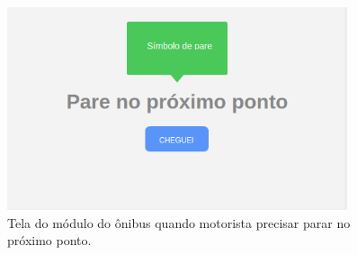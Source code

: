 \documentclass[
	12pt,				%
	oneside,			%
	a4paper,			%
	brazil				%
]{abntex2}
\begin{document}
\begin{figure}[!h]
\centering
\includegraphics[width=10cm, center]{images/busmodule-pare}
\caption{Tela do módulo do ônibus quando motorista precisar parar no próximo ponto.}
\label{Rotulo}
\end{figure}
\end{document}
